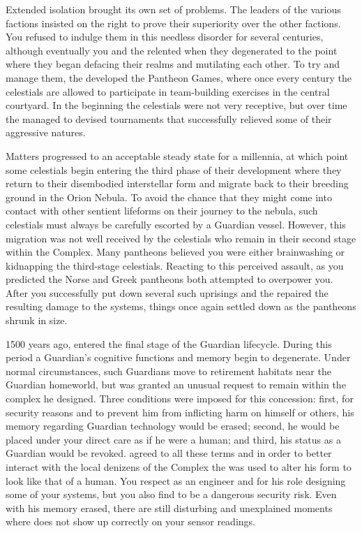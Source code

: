\documentclass[char]{guardians}
\begin{document}
Extended isolation brought its own set of problems. The leaders of the various factions insisted on the right to prove their superiority over the other factions. You refused to indulge them in this needless disorder for several centuries, although eventually you and the \cCaretaker{} relented when they degenerated to the point where they began defacing their realms and mutilating each other. To try and manage them, the \cCaretaker{} developed the Pantheon Games, where once every century the celestials are allowed to participate in team-building exercises in the central courtyard. In the beginning the celestials were not very receptive, but over time the \cCaretaker{} managed to devised tournaments that successfully relieved some of their aggressive natures.

Matters progressed to an acceptable steady state for a millennia, at which point some celestials begin entering the third phase of their development where they return to their disembodied interstellar form and migrate back to their breeding ground in the Orion Nebula. To avoid the chance that they might come into contact with other sentient lifeforms on their journey to the nebula, such celestials must always be carefully escorted by a Guardian vessel. However, this migration was not well received by the celestials who remain in their second stage within the Complex. Many pantheons believed you were either brainwashing or kidnapping the third-stage celestials. Reacting to this perceived assault, as you predicted the Norse and Greek pantheons both attempted to overpower you. After you successfully put down several such uprisings and the \cCaretaker{} repaired the resulting damage to the systems, things once again settled down as the pantheons shrunk in size.

1500 years ago, \cJascha{} entered the final stage of the Guardian lifecycle. During this period a Guardian's cognitive functions and memory begin to degenerate. Under normal circumstances, such Guardians move to retirement habitats near the Guardian homeworld, but \cJascha{} was granted an unusual request to remain within the complex he designed. Three conditions were imposed for this concession: first, for security reasons and to prevent him from inflicting harm on himself or others, his memory regarding Guardian technology would be erased; second, he would be placed under your direct care as if he were a human; and third, his status as a Guardian would be revoked. \cJascha{} agreed to all these terms and in order to better interact with the local denizens of the Complex the \assembler{} was used to alter his form to look like that of a human. You respect \cJascha{} as an engineer and for his role designing some of your systems, but you also find \cJascha{\them} to be a dangerous security risk. Even with his memory erased, there are still disturbing and unexplained moments where \cJascha{\they} does not show up correctly on your sensor readings.
\end{document}
